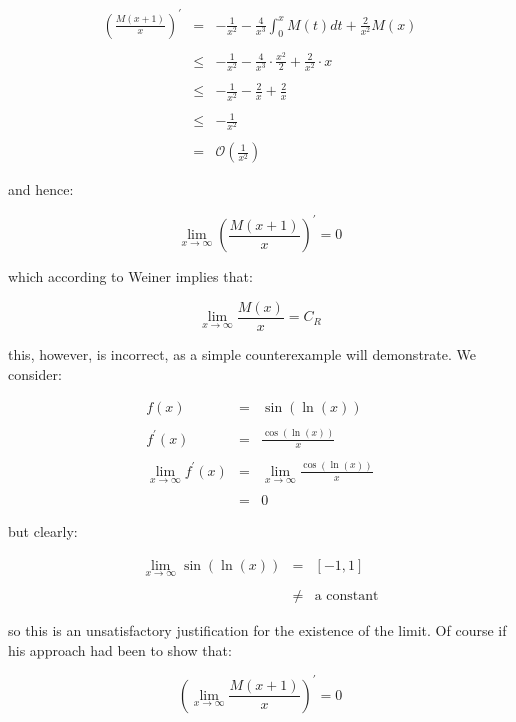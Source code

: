 \begin{eqnarray*} 
	\left(\frac{M(x + 1)}{x}\right)^{\prime} & =    & -\frac{1}{x^2} - \frac{4}{x^3} \int_{0}^{x} M(t) dt + \frac{2}{x^2} M(x) \\\\
											 & \leq & -\frac{1}{x^2} - \frac{4}{x^3} \cdot \frac{x^2}{2} + \frac{2}{x^2} \cdot x \\\\
											 & \leq & -\frac{1}{x^2} - \frac{2}{x} + \frac{2}{x} \\\\
											 & \leq & -\frac{1}{x^2} \\\\
											 & =    & \mathcal{O}\left(\frac{1}{x^2}\right) 
\end{eqnarray*}\medskip

and hence: \bigskip

\[
	\lim_{x \to \infty} \left(\frac{M(x + 1)}{x}\right)^{\prime} = 0
\]\medskip

which according to Weiner implies that: \bigskip

\[
	\lim_{x \to \infty} \frac{M(x)}{x} = C_R
\]\medskip

this, however, is incorrect, as a simple counterexample will demonstrate. We consider: \bigskip

\begin{eqnarray*}
								 f(x) & = & \sin(\ln(x)) \\\\
						f^{\prime}(x) & = & \frac{\cos(\ln(x))}{x} \\\\
	\lim_{x \to \infty} f^{\prime}(x) & = & \lim_{x \to \infty} \frac{\cos(\ln(x))}{x} \\\\
									  & = & 0
\end{eqnarray*}\medskip

but clearly: \bigskip

\begin{eqnarray*}
	\lim_{x \to \infty} \sin(\ln(x)) & =    & [-1, 1] \\\\
									 & \neq & \text{a constant} 
\end{eqnarray*}\medskip

so this is an unsatisfactory justification for the existence of the limit. Of course if his approach 
had been to show that: \bigskip 

\[
	\left( \lim_{x \to \infty} \frac{M(x + 1)}{x}\right)^{\prime} = 0
\]\medskip

